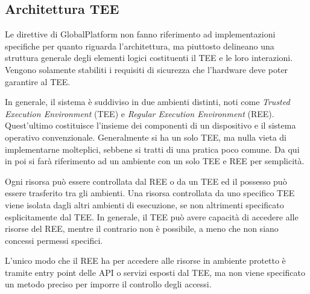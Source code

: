\documentclass[12pt,italian]{report}
\begin{document}
	\newpage
	
	\subsection{Architettura TEE}
	\label{subsec:architettura}
	Le direttive di GlobalPlatform non fanno riferimento ad implementazioni specifiche per quanto riguarda l'architettura, ma piuttosto delineano una struttura generale degli elementi logici costituenti il TEE e le loro interazioni. Vengono solamente stabiliti i requisiti di sicurezza che l'hardware deve poter garantire al TEE.
	
	\bigbreak
	
	In generale, il sistema è suddiviso in due ambienti distinti, noti come \textit{Trusted Execution Environment} (TEE) e \textit{Regular Execution Environment} (REE). Quest'ultimo costituisce l'insieme dei componenti di un dispositivo e il sistema operativo convenzionale. Generalmente si ha un solo TEE, ma nulla vieta di implementarne molteplici, sebbene si tratti di una pratica poco comune. Da qui in poi si farà riferimento ad un ambiente con un solo TEE e REE per semplicità.
	
	Ogni risorsa può essere controllata dal REE o da un TEE ed il possesso può essere trasferito tra gli ambienti. Una risorsa controllata da uno specifico TEE viene isolata dagli altri ambienti di esecuzione, se non altrimenti specificato esplicitamente dal TEE. In generale, il TEE può avere capacità di accedere alle risorse del REE, mentre il contrario non è possibile, a meno che non siano concessi permessi specifici. 
	
	L'unico modo che il REE ha per accedere alle risorse in ambiente protetto è tramite entry point delle API o servizi esposti dal TEE, ma non viene specificato un metodo preciso per imporre il controllo degli accessi.
	
\end{document}
